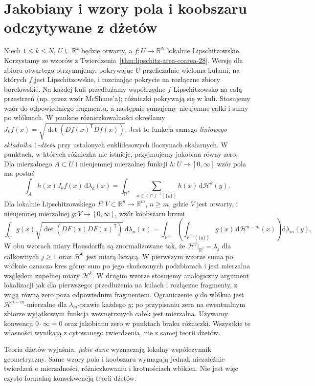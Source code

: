 \section{Jakobiany i wzory pola i koobszaru odczytywane z dżetów}
Niech $1\le k\le N$, $U\subseteq\mathbb R^k$ będzie
otwarty, a $f:U\to\mathbb R^N$ lokalnie Lipschitzowskie.
Korzystamy ze wzorów z Twierdzenia~\ref{thm:lipschitz-area-coarea-28}.
Wersję dla zbioru otwartego otrzymujemy, pokrywając
$U$ przeliczalnie wieloma kulami, na których $f$
jest Lipschitzowskie, i rozcinając pokrycie na
rozłączne zbiory borelowskie. Na każdej kuli
przedłużamy współrzędne $f$ Lipschitzowsko na
całą przestrzeń (np. przez wzór McShane'a);
różniczki pokrywają się w kuli. Stosujemy wzór
do odpowiedniego fragmentu, a następnie sumujemy
nieujemne całki i sumy po włóknach.
W punkcie różniczkowalności określamy
$J_kf(x)=\sqrt{\det(Df(x)^{\mathsf T}Df(x))}$.
Jest to funkcja samego \emph{liniowego składnika $1$-dżetu}
przy ustalonych euklidesowych iloczynach skalarnych.
W punktach, w których różniczka nie istnieje,
przyjmujemy jakobian równy zero.
Dla mierzalnego $A\subset U$ i nieujemnej
mierzalnej funkcji $h:U\to[0,\infty]$ wzór pola ma postać
\[
 \int_A h(x)J_kf(x)\,\mathrm d\lambda_k(x)
 =\int_{\mathbb R^N}\sum_{x\in A\cap f^{-1}(\{y\})}
 h(x)\,\mathrm d\mathcal H^k(y).
\]
Dla lokalnie Lipschitzowskiego $F:V\subset\mathbb R^n\to
\mathbb R^m$, $n\ge m$, gdzie $V$ jest otwarty,
i nieujemnej mierzalnej $g:V\to[0,\infty]$, wzór
koobszaru brzmi
\[
 \int_V g(x)\sqrt{\det(DF(x)DF(x)^{\mathsf T})}
 \,\mathrm d\lambda_n(x)
 =\int_{\mathbb R^m}\left(
 \int_{F^{-1}(\{y\})}g(x)\,\mathrm d\mathcal H^{n-m}(x)
 \right)\mathrm d\lambda_m(y).
\]
W obu wzorach miary Hausdorffa są znormalizowane tak,
że $\mathcal H^j|_{\mathbb R^j}=\lambda_j$ dla całkowitych
$j\ge1$ oraz $\mathcal H^0$ jest miarą liczącą.
W pierwszym wzorze suma po włóknie oznacza kres
górny sum po jego skończonych podzbiorach i jest
mierzalna względem zupełnej miary $\mathcal H^k$.
W drugim wzorze stosujemy analogiczny argument
lokalizacji jak dla pierwszego: przedłużenia na
kulach i rozłączne fragmenty, z wagą równą zero
poza odpowiednim fragmentem. Ograniczenie $g$
do włókna jest $\mathcal H^{n-m}$-mierzalne dla
$\lambda_m$-prawie każdego $y$; po przypisaniu
zera na ewentualnym zbiorze wyjątkowym funkcja
wewnętrznych całek jest mierzalna. Używamy
konwencji $0\cdot\infty=0$ oraz jakobianu zero
w punktach braku różniczki. Wszystkie te własności
wynikają z cytowanego twierdzenia, nie z samej
teorii dżetów.

\begin{uwaga}
Teoria dżetów wyjaśnia, \emph{jakie dane} wyznaczają
lokalny współczynnik geometryczny. Same wzory pola i koobszaru
wymagają jednak niezależnie twierdzeń o mierzalności,
różniczkowaniu i krotnościach włókien. Nie jest więc
czysto formalną konsekwencją teorii dżetów.
\end{uwaga}

